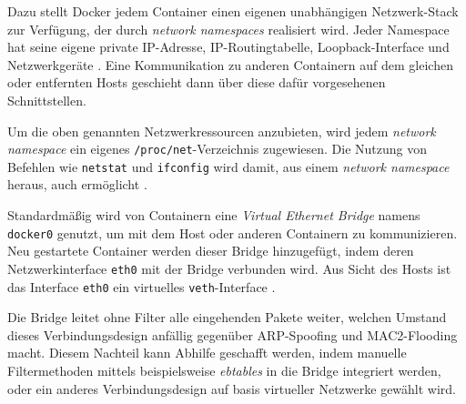 \documentclass[../main.tex]{subfiles}
\begin{document}
			Dazu stellt Docker jedem Container einen eigenen unabhängigen Netzwerk-Stack zur Verfügung, der durch \emph{network namespaces} realisiert wird. Jeder Namespace hat seine eigene private IP-Adresse, IP-Routingtabelle, Loopback-Interface und Netzwerkgeräte \cite[S.2+3]{virtVSContainer}. Eine Kommunikation zu anderen Containern auf dem gleichen oder entfernten Hosts geschieht dann über diese dafür vorgesehenen Schnittstellen.

			Um die oben genannten Netzwerkressourcen anzubieten, wird jedem \emph{network namespace} ein eigenes \texttt{/proc/net}-Verzeichnis zugewiesen. Die Nutzung von Befehlen wie \texttt{netstat} und \texttt{ifconfig} wird damit, aus einem \emph{network namespace} heraus, auch ermöglicht \cite[S.7]{IBMcheckpointRestart}.

			Standardmäßig wird von Containern eine \emph{Virtual Ethernet Bridge} namens \texttt{docker0} genutzt, um mit dem Host oder anderen Containern zu kommunizieren. Neu gestartete Container werden dieser Bridge hinzugefügt, indem deren Netzwerkinterface \texttt{eth0} mit der Bridge verbunden wird. Aus Sicht des Hosts ist das Interface \texttt{eth0} ein virtuelles \texttt{veth}-Interface \cite[S.3]{virtVSContainer}.

			Die Bridge leitet ohne Filter alle eingehenden Pakete weiter, welchen Umstand dieses Verbindungsdesign anfällig gegenüber \acrshort{ARP}-Spoofing und \acrshort{MAC2}-Flooding macht. Diesem Nachteil kann Abhilfe geschafft werden, indem manuelle Filtermethoden mittels beispielsweise \emph{ebtables} in die Bridge integriert werden, oder ein anderes Verbindungsdesign auf basis virtueller Netzwerke gewählt wird.



			\cite[S.4]{dockerSec1}

\end{document}
